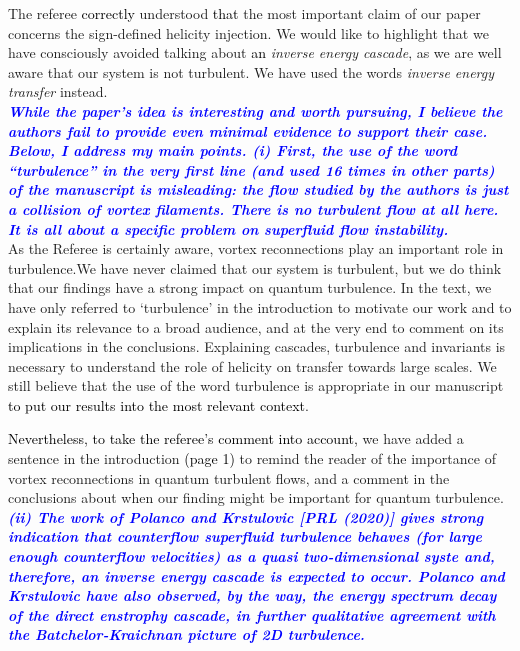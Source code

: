 \documentclass[a4paper,10pt]{article}
\def\red#1{\textcolor{black}{#1}}
\def\blue#1{\textcolor{blue}{#1}}
\def\refcomment#1{\textbf{\blue{\emph{#1}}}\\}
\begin{document}
The referee \red{correctly} understood \red{that}
the most important claim of our paper concerns the sign-defined helicity 
injection. We would like to highlight that we have consciously avoided 
talking about \red{an} {\it inverse energy cascade}, as we are well aware 
that our system is not turbulent. We have used the words {\it inverse energy transfer} instead.\\

\refcomment{While the paper’s idea is interesting and worth pursuing, I believe the authors fail to provide even minimal evidence to support their case. Below, I address my main points.
(i) First, the use of the word “turbulence” in the very first line (and used 16 times in other parts) of the manuscript is misleading: the flow studied by the authors is just a collision of vortex filaments. There is no turbulent flow at all here. It is all about a specific problem on superfluid flow instability.}

As the Referee is certainly aware, vortex reconnections play an important role in turbulence.We have never claimed that our system is turbulent, but we do think that our findings have a strong impact on quantum turbulence. In the text, we have only referred to `turbulence' in the introduction to motivate our work and to explain its relevance to a broad audience, and at the very end to comment on its implications in the conclusions. Explaining cascades, turbulence and invariants is necessary to understand the role of helicity on transfer towards large scales. We still believe that the use of the word turbulence is 
appropriate in our manuscript \red{to put our results into the most 
relevant context}. 

\red{Nevertheless, to take the referee's comment into account,}
we have added a sentence in the introduction \red{(page 1)}
to remind the reader of the importance of vortex reconnections 
in quantum turbulent flows, and a comment in the conclusions 
about when our finding might be important for quantum turbulence. \\

\refcomment{(ii) The work of Polanco and Krstulovic [PRL (2020)] gives strong indication that counterflow superfluid turbulence behaves (for large enough counterflow velocities) as a quasi two-dimensional syste and, therefore, an inverse energy cascade is expected to occur. Polanco and Krstulovic have also observed, by the way, the energy spectrum decay of the direct enstrophy cascade, in further qualitative agreement with the Batchelor-Kraichnan picture of 2D turbulence.}
\end{document}
